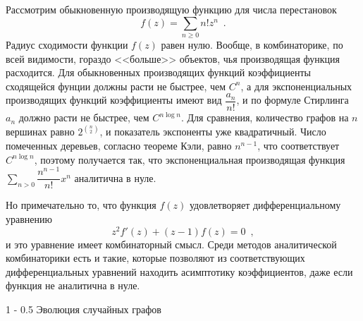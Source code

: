 \documentclass{article}
\makeatletter
\theoremstyle{definition}
\renewcommand{\subsection}{\@startsection
{subsection}%
{1}%
{\z@}%
{-\baselineskip}%
{0.5\baselineskip}%
{\centering\large\scshape}} %
\makeatother
\begin{document}
Рассмотрим обыкновенную производящую функцию для числа перестановок
\[
	f(z) = \sum_{n \geq 0} n! z^n \enspace .
\]
Радиус сходимости функции \( f(z) \) равен нулю. Вообще, в комбинаторике, по 
всей видимости, гораздо <<больше>> объектов, чья производящая функция 
расходится. Для обыкновенных производящих функций коэффициенты сходящейся 
фунции должны расти не быстрее, чем \( C^{n} \), а для экспоненциальных 
производящих функций коэффициенты имеют вид \( \dfrac{a_n}{n!} \), и по формуле 
Стирлинга \( a_n \) должно расти не быстрее, чем \( C^{n \log n} \). Для 
сравнения, количество графов на \( n \) вершинах равно \( 2^{{n \choose 2}} \), 
и показатель экспоненты уже квадратичный. Число помеченных деревьев, согласно 
теореме Кэли, равно \( n^{n-1} \), что соответствует \( C^{n \log n} \), 
поэтому получается так, что экспоненциальная производящая функция \( \sum_{n > 
0} \dfrac{n^{n-1}}{n!} x^n \) аналитична в нуле.

Но примечательно то, что функция \( f(z) \) удовлетворяет дифференциальному 
уравнению
\[
	z^2 f'(z) + (z-1) f(z) = 0 \enspace ,
\]
и это уравнение имеет комбинаторный смысл. Среди методов аналитической 
комбинаторики есть и такие, которые позволяют из соответствующих 
дифференциальных уравнений находить асимптотику коэффициентов, даже если 
функция не аналитична в нуле.

\subsection{Эволюция случайных графов}
\end{document}
